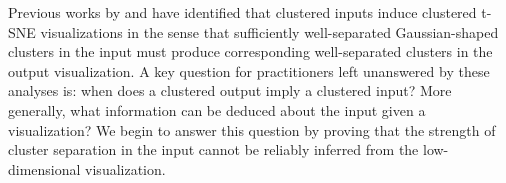 




Previous works by \citet{linderman2019clustering} and \citet{arora2018analysis} have identified that clustered inputs induce clustered t-SNE visualizations in the sense that sufficiently well-separated Gaussian-shaped clusters in the input must produce corresponding well-separated clusters in the output visualization. %
A key question for practitioners left unanswered by these analyses is: when does a clustered output imply a clustered input? 
More generally, what information can be deduced about the input given a visualization? We begin to answer this question by proving that the strength of cluster separation in the input cannot be reliably inferred from the low-dimensional visualization. 





